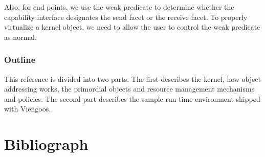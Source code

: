 \documentclass[12pt,a4paper]{book}
\begin{document}
Also, for end points, we use the weak predicate to determine whether
the capability interface designates the send facet or the receive
facet.  To properly virtualize a kernel object, we need to allow the
user to control the weak predicate as normal.

\section{Outline}

This reference is divided into two parts.  The first describes the
kernel, how object addressing works, the primordial objects and
resource management mechanisms and policies.  The second part
describes the sample run-time environment shipped with Viengoos.




\part{Bibliograph}




\backmatter

\end{document}
